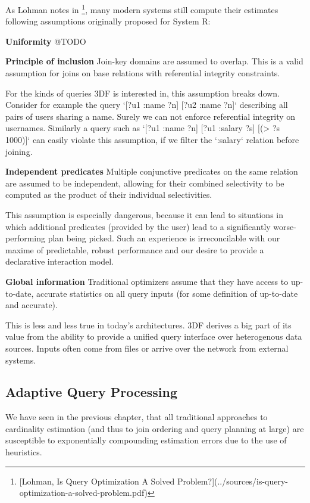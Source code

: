 \documentclass[../index.tex]{subfiles}
\begin{document}
As Lohman notes in \footnote{[Lohman, Is Query Optimization A Solved Problem?](../sources/is-query-optimization-a-solved-problem.pdf)}, many modern systems still compute their
estimates following assumptions originally proposed for System R:

\textbf{\textbf{Uniformity}} @TODO

\textbf{\textbf{Principle of inclusion}} Join-key domains are assumed to
overlap. This is a valid assumption for joins on base relations with
referential integrity constraints. 

For the kinds of queries 3DF is interested in, this assumption breaks
down. Consider for example the query `[?u1 :name ?n] [?u2 :name ?n]`
describing all pairs of users sharing a name. Surely we can not
enforce referential integrity on usernames. Similarly a query such as
`[?u1 :name ?n] [?u1 :salary ?s] [(> ?s 1000)]` can easily violate
this assumption, if we filter the `:salary` relation before joining.

\textbf{\textbf{Independent predicates}} Multiple conjunctive predicates on the same
relation are assumed to be independent, allowing for their combined
selectivity to be computed as the product of their individual
selectivities. 

This assumption is especially dangerous, because it can lead to
situations in which additional predicates (provided by the user) lead
to a significantly worse-performing plan being picked. Such an
experience is irreconcilable with our maxime of predictable, robust
performance and our desire to provide a declarative interaction model.

\textbf{\textbf{Global information}} Traditional optimizers assume that they have
access to up-to-date, accurate statistics on all query inputs (for
some definition of up-to-date and accurate). 

This is less and less true in today's architectures. 3DF derives a big
part of its value from the ability to provide a unified query
interface over heterogenous data sources. Inputs often come from files
or arrive over the network from external systems.

\subsection{Adaptive Query Processing}

We have seen in the previous chapter, that all traditional approaches
to cardinality estimation (and thus to join ordering and query
planning at large) are susceptible to exponentially compounding
estimation errors due to the use of heuristics.
\end{document}
